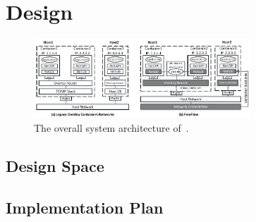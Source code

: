 \section{Design} \label{sec:design}

\begin{figure}[t!] 
     \centering 
     \includegraphics[width=3.2in]{figures/system-arch} 
    \caption{\label{fig:sysarch} The overall system architecture of~\sysname.} 
\end{figure} 


\subsection{Design Space}

\subsection{Implementation Plan}